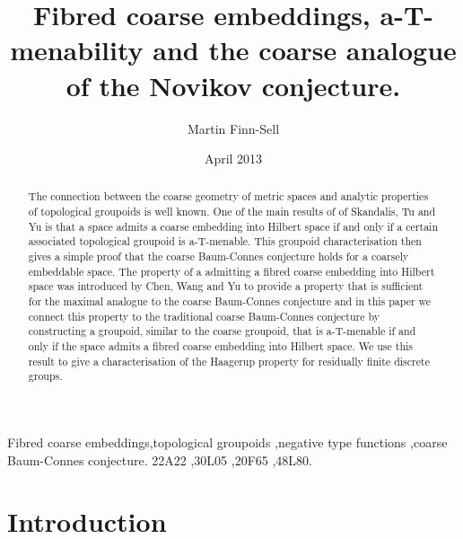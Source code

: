 \documentclass[preprint]{elsarticle}
\theoremstyle{plain}
\theoremstyle{definition}%
\theoremstyle{remark}%
\begin{document}
\title{Fibred coarse embeddings, a-T-menability and the coarse analogue of the Novikov conjecture.} 
\date{April 2013}
\author[UoS]{Martin Finn-Sell}
\address[UoS]{School of Mathematics, University of Southampton, Southampton, SO17 1BJ, United Kingdom}



\begin{abstract}
The connection between the coarse geometry of metric spaces and analytic properties of topological groupoids is well known. One of the main results of of Skandalis, Tu and Yu is that a space admits a coarse embedding into Hilbert space if and only if a certain associated topological groupoid is a-T-menable. This groupoid characterisation then gives a simple proof that the coarse Baum-Connes conjecture holds for a coarsely embeddable space. The property of a admitting a fibred coarse embedding into Hilbert space was introduced by Chen, Wang and Yu to provide a property that is sufficient for the maximal analogue to the coarse Baum-Connes conjecture and in this paper we connect this property to the traditional coarse Baum-Connes conjecture by constructing a groupoid, similar to the coarse groupoid, that is a-T-menable if and only if the space admits a fibred coarse embedding into Hilbert space. We use this result to give a characterisation of the Haagerup property for residually finite discrete groups.
\end{abstract}

\begin{keyword}
Fibred coarse embeddings\sep topological groupoids \sep negative type functions \sep coarse Baum-Connes conjecture.
\MSC[2010] 22A22 \sep 30L05 \sep 20F65 \sep 48L80.
\end{keyword}

\maketitle

\section{Introduction}
\end{document}
